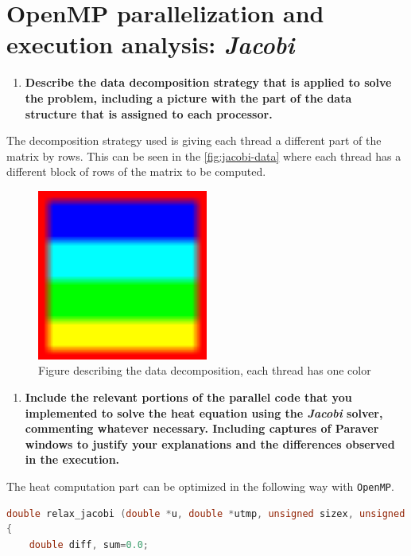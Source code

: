 \documentclass[a4paper]{article}
\newenvironment{questionenum}{%
\setlist[enumerate]{resume}
\restartlist{enumerate}
\newcommand{\question}[1]{
\begin{enumerate}
	\item\bfseries ##1
\end{enumerate}
}}{%
}
\begin{document}
\section{OpenMP parallelization and execution analysis: \emph{Jacobi}}
\begin{questionenum}
	\question{Describe the data decomposition strategy that is applied to solve the problem, including a picture with the part of the data structure that is assigned to each processor.}
	
	The decomposition strategy used is giving each thread a different part of the matrix by rows. This can be seen in the \autoref{fig:jacobi-data} where each thread has a different block of rows of the matrix to be computed. 
	
	\begin{figure}[H]
		\centering
		\includegraphics[width=0.5\textwidth]{images/jacobi/data}
		\caption{Figure describing the data decomposition, each thread has one color}
		\label{fig:jacobi-data}
	\end{figure}
	
	\question{Include the relevant portions of the parallel code that you implemented to solve the heat equation using the \emph{Jacobi} solver, commenting whatever necessary. Including captures of Paraver windows to justify your explanations and the differences observed in the execution.}
	
	The heat computation part can be optimized in the following way with \texttt{OpenMP}. 
	\begin{center}
		
	\begin{minipage}{0.9\textwidth}
		\begin{lstlisting}[language=C, title=\texttt{solver-tareador.c}]
double relax_jacobi (double *u, double *utmp, unsigned sizex, unsigned sizey)
{
	double diff, sum=0.0;
	

\end{lstlisting}
\end{minipage}
\end{center}
\end{questionenum}
\end{document}
